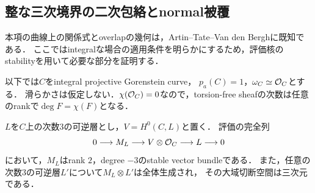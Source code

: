 \documentclass[11pt,a4paper]{ltjsarticle}
\begin{document}
\subsection{整な三次境界の二次包絡とnormal被覆}

本項の曲線上の関係式とoverlapの幾何は，Artin--Tate--Van den Bergh\cite[Theorem 6.6, \S7]{ATV1990}に既知である．
ここではintegralな場合の適用条件を明らかにするため，評価核のstabilityを用いて必要な部分を証明する．

以下では$C$をintegral projective Gorenstein curve，
$p_a(C)=1$，$\omega_C\simeq\mathcal O_C$とする．
滑らかさは仮定しない．$\chi(\mathcal O_C)=0$なので，torsion-free sheafの次数は任意のrankで$\deg F=\chi(F)$となる．

\begin{lemma}[次数3の評価核]\label{lem:cubic-evaluation-kernel}
$L$を$C$上の次数3の可逆層とし，$V=H^0(C,L)$と置く．
評価の完全列
\[
 0\longrightarrow M_L\longrightarrow V\otimes\mathcal O_C
 \longrightarrow L\longrightarrow0
\]
において，$M_L$はrank $2$，degree $-3$のstable vector bundleである．
また，任意の次数3の可逆層$L'$について$M_L\otimes L'$は全体生成され，
その大域切断空間は三次元である．
\end{lemma}
\end{document}

